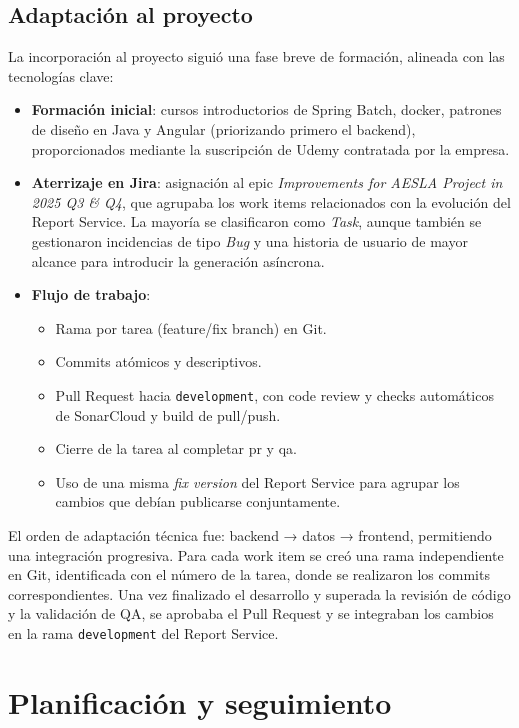 \documentclass[11pt,a4paper,titlepage,oneside]{report}
\begin{document}
\subsection{Adaptación al proyecto}

La incorporación al proyecto siguió una fase breve de formación, alineada con las tecnologías clave:

\begin{itemize}
  \item \textbf{Formación inicial}: cursos introductorios de Spring Batch, \gls{docker}, patrones de diseño en Java y Angular (priorizando primero el backend), proporcionados mediante la suscripción de Udemy contratada por la empresa.
  \item \textbf{Aterrizaje en Jira}: asignación al \acrshort{epic} \textit{Improvements for AESLA Project in 2025 Q3 \& Q4}, que agrupaba los work items relacionados con la evolución del Report Service. La mayoría se clasificaron como \textit{Task}, aunque también se gestionaron incidencias de tipo \textit{Bug} y una historia de usuario de mayor alcance para introducir la generación asíncrona.
  \item \textbf{Flujo de trabajo}:
    \begin{itemize}
      \item Rama por tarea (feature/fix branch) en Git.
      \item Commits atómicos y descriptivos.
      \item Pull Request hacia \texttt{development}, con code review y checks automáticos de SonarCloud y build de pull/push.
      \item Cierre de la tarea al completar \acrshort{pr} y \acrshort{qa}.
      \item Uso de una misma \textit{fix version} del Report Service para agrupar los cambios que debían publicarse conjuntamente.
    \end{itemize}
\end{itemize}

El orden de adaptación técnica fue: backend → datos → frontend, permitiendo una integración progresiva. Para cada work item se creó una rama independiente en Git, identificada con el número de la tarea, donde se realizaron los commits correspondientes. Una vez finalizado el desarrollo y superada la revisión de código y la validación de QA, se aprobaba el Pull Request y se integraban los cambios en la rama \texttt{development} del Report Service.

\section{Planificación y seguimiento}
\end{document}
